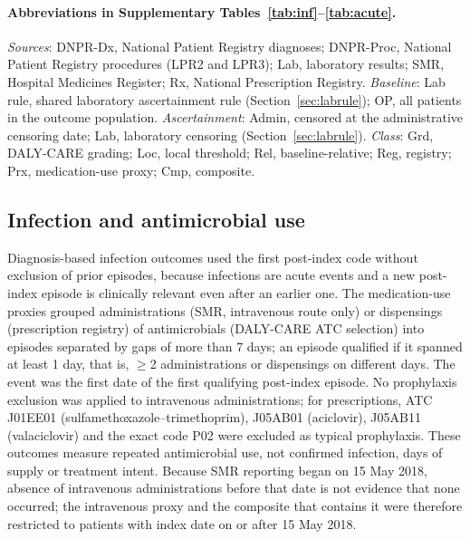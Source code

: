 \documentclass[10pt]{article}
\begin{document}
\paragraph{Abbreviations in Supplementary Tables~\ref{tab:inf}--\ref{tab:acute}.}
\emph{Sources}: DNPR-Dx, National Patient Registry diagnoses; DNPR-Proc,
National Patient Registry procedures (LPR2 and LPR3); Lab, laboratory results;
SMR, Hospital Medicines Register; Rx, National Prescription Registry.
\emph{Baseline}: Lab rule, shared laboratory ascertainment rule
(Section~\ref{sec:labrule}); OP, all patients in the outcome population.
\emph{Ascertainment}: Admin, censored at the administrative censoring date;
Lab, laboratory censoring (Section~\ref{sec:labrule}).
\emph{Class}: Grd, DALY-CARE grading; Loc, local threshold; Rel,
baseline-relative; Reg, registry; Prx, medication-use proxy; Cmp, composite.

\subsection{Infection and antimicrobial use}\label{sec:infections}
Diagnosis-based infection outcomes used the first post-index code without
exclusion of prior episodes, because infections are acute events and a new
post-index episode is clinically relevant even after an earlier one. The
medication-use proxies grouped administrations (SMR, intravenous route only)
or dispensings (prescription registry) of antimicrobials (DALY-CARE ATC
selection) into episodes separated by gaps of more than 7 days; an episode
qualified if it spanned at least 1 day, that is, $\ge$2 administrations or
dispensings on different days. The event was the first date of the first
qualifying post-index episode. No prophylaxis exclusion was applied to
intravenous administrations; for prescriptions, ATC J01EE01
(sulfamethoxazole--trimethoprim), J05AB01 (aciclovir), J05AB11
(valaciclovir) and the exact code P02 were excluded as typical prophylaxis.
These outcomes measure repeated antimicrobial use, not confirmed infection,
days of supply or treatment intent. Because SMR reporting began on 15 May 2018,
absence of intravenous administrations before that date is not evidence that
none occurred; the intravenous proxy and the composite that contains it were
therefore restricted to patients with index date on or after 15 May 2018.
\end{document}
